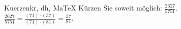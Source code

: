 \begin{MAufgabe}{Kuerzen}{kr, dh, MaTeX}
K\"urzen Sie soweit m\"oglich: $\frac{2627}{5751}$.\\ 
\ifLsg\MLoesung
\quad $\frac{2627}{5751}=\frac{(71)\cdot(37)}{(71)\cdot(81)}=\frac{37}{81}$.\else\relax\fi
 \end{MAufgabe}